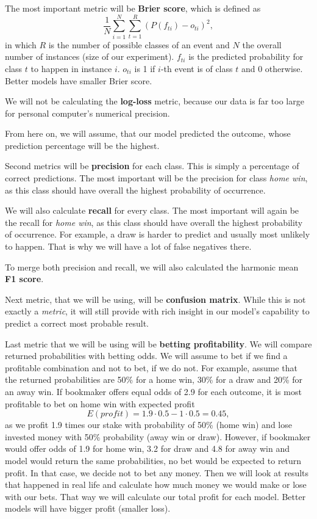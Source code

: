 \documentclass[conference]{IEEEtran}
\begin{document}
The most important metric will be \textbf{Brier score}, which is defined as 
$$\frac{1}{N} \sum_{i=1}^{N} \sum_{t=1}^{R} {(P(f_{ti}) - o_{ti})^2},$$ in which $R$ is the
number of possible classes of an event and $N$ the overall number of instances (size of our
experiment). $f_{ti}$ is the predicted probability for class $t$ to happen in instance $i$.
$o_{ti}$ is 1 if $i$-th event is of class $t$ and 0 otherwise. Better models have smaller 
Brier score.

We will not be calculating the \textbf{log-loss} metric, because our data is far too large 
for personal computer's numerical precision.

From here on, we will assume, that our model predicted the outcome, whose prediction 
percentage will be the highest. 

Second metrics will be \textbf{precision} for each class. This is simply a percentage of
correct predictions. The most important will be the precision for class \textit{home win}, as
this class should have overall the highest probability of occurrence.

We will also calculate \textbf{recall} for every class. The most important will again be the
recall for \textit{home win}, as this class should have overall the highest probability of
occurrence. For example, a draw is harder to predict and usually most unlikely to happen. That
is why we will have a lot of false negatives there.

To merge both precision and recall, we will also calculated the harmonic mean \textbf{F1 score}.

Next metric, that we will be using, will be \textbf{confusion matrix}. While this is not
exactly a \textit{metric}, it will still provide with rich insight in our model's capability 
to predict a correct most probable result.

Last metric that we will be using will be \textbf{betting profitability}. We will 
compare returned probabilities with betting odds. We will assume to bet if we find a 
profitable combination and not to bet, if we do not. For example, assume that the returned 
probabilities are 50\% for a home win, 30\% for a draw and 20\% for an away win. If bookmaker 
offers equal odds of 2.9 for each outcome, it is most profitable to bet on home win with 
expected profit $$E(profit) = 1.9 \cdot 0.5 - 1 \cdot 0.5 = 0.45, $$
as we profit 1.9 times our stake with probability of 50\% (home win) and lose invested money
with 50\% probability (away win or draw). However, if bookmaker would offer odds of 1.9 for
home win, 3.2 for draw and 4.8 for away win and model would return the same probabilities, no
bet would be expected to return profit. In that case, we decide not to bet any money.
Then we will look at results that happened in real life and calculate how much money we 
would make or lose with our bets. That way we will calculate our total profit for
each model. Better models will have bigger profit (smaller loss).
\end{document}
